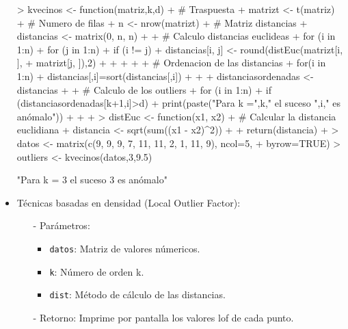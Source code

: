 \documentclass[a4paper, 12pt]{article}
\begin{document}
\begin{itemize}
\begin{itemize}
			\end{itemize}
\begin{Schunk}
\begin{Sinput}
> kvecinos <- function(matriz,k,d){
+     # Traspuesta
+     matrizt <- t(matriz)
+     # Numero de filas
+     n <- nrow(matrizt)
+     # Matriz distancias
+     distancias <- matrix(0, n, n)
+      
+     # Calculo distancias euclideas
+     for (i in 1:n) {
+         for (j in 1:n) {
+             if (i != j) {
+                 distancias[i, j] <- round(distEuc(matrizt[i, ],
+ 				matrizt[j, ]),2)
+             }
+         }
+     }
+  
+     # Ordenacion de las distancias
+     for(i in 1:n){
+         distancias[,i]=sort(distancias[,i])
+     } 
+      
+     distanciasordenadas <- distancias
+ 
+     # Calculo de los outliers
+     for (i in 1:n) {
+         if (distanciasordenadas[k+1,i]>d) {
+             print(paste("Para k =",k," el suceso ",i," es anómalo"))
+         }
+     }
+ }
> distEuc <- function(x1, x2) {
+     # Calcular la distancia euclidiana
+     distancia <- sqrt(sum((x1 - x2)^2))
+    
+     return(distancia)
+ }
> datos <- matrix(c(9, 9, 9, 7, 11, 11, 2, 1, 11, 9), ncol=5, 
+ byrow=TRUE)
> outliers <- kvecinos(datos,3,9.5)
\end{Sinput}
\begin{Soutput}
[1] "Para k = 3  el suceso  3  es anómalo"
\end{Soutput}
\end{Schunk}
			\item Técnicas basadas en densidad (Local Outlier Factor):
			\begin{itemize}
				\item[-] Parámetros:
				\begin{itemize}
					\item \texttt{datos}: Matriz de valores númericos.
					\item \texttt{k}: Número de orden k.
					\item \texttt{dist}: Método de cálculo de las distancias.
				\end{itemize}

				\item[-] Retorno: Imprime por pantalla los valores lof de cada punto.
				

\end{itemize}
\end{itemize}
\end{document}
